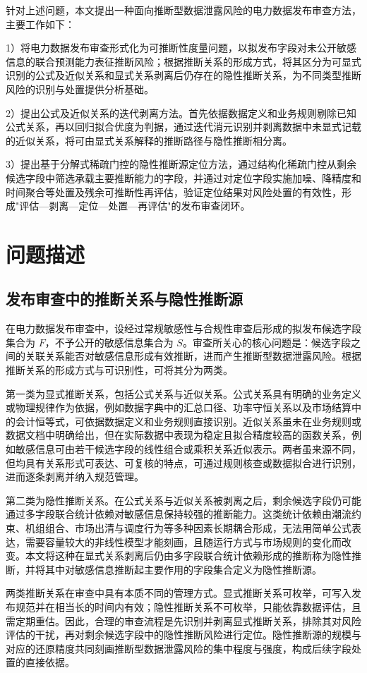 \documentclass[UTF8,zihao=5,twoside,fontset=none]{ctexart}
\begin{document}
针对上述问题，本文提出一种面向推断型数据泄露风险的电力数据发布审查方法，主要工作如下：

1）将电力数据发布审查形式化为可推断性度量问题，以拟发布字段对未公开敏感信息的联合预测能力表征推断风险；根据推断关系的形成方式，将其区分为可显式识别的公式及近似关系和显式关系剥离后仍存在的隐性推断关系，为不同类型推断风险的识别与处置提供分析基础。

2）提出公式及近似关系的迭代剥离方法。首先依据数据定义和业务规则剔除已知公式关系，再以回归拟合优度为判据，通过迭代消元识别并剥离数据中未显式记载的近似关系，将可由显式关系解释的推断路径与隐性推断相分离。

3）提出基于分解式稀疏门控的隐性推断源定位方法，通过结构化稀疏门控从剩余候选字段中筛选承载主要推断能力的字段，并通过对定位字段实施加噪、降精度和时间聚合等处置及残余可推断性再评估，验证定位结果对风险处置的有效性，形成"评估—剥离—定位—处置—再评估"的发布审查闭环。

\section{问题描述}

{\color{blue}
\subsection{发布审查中的推断关系与隐性推断源}

在电力数据发布审查中，设经过常规敏感性与合规性审查后形成的拟发布候选字段集合为 $F$，不予公开的敏感信息集合为 $S$。审查所关心的核心问题是：候选字段之间的关联关系能否对敏感信息形成有效推断，进而产生推断型数据泄露风险。根据推断关系的形成方式与可识别性，可将其分为两类。

第一类为显式推断关系，包括公式关系与近似关系。公式关系具有明确的业务定义或物理规律作为依据，例如数据字典中的汇总口径、功率守恒关系以及市场结算中的会计恒等式，可依据数据定义和业务规则直接识别。近似关系虽未在业务规则或数据文档中明确给出，但在实际数据中表现为稳定且拟合精度较高的函数关系，例如敏感信息可由若干候选字段的线性组合或乘积关系近似表示。两者虽来源不同，但均具有关系形式可表达、可复核的特点，可通过规则核查或数据拟合进行识别，进而逐条剥离并纳入规范管理。

第二类为隐性推断关系。在公式关系与近似关系被剥离之后，剩余候选字段仍可能通过多字段联合统计依赖对敏感信息保持较强的推断能力。这类统计依赖由潮流约束、机组组合、市场出清与调度行为等多种因素长期耦合形成，无法用简单公式表达，需要容量较大的非线性模型才能刻画，且随运行方式与市场规则的变化而改变。本文将这种在显式关系剥离后仍由多字段联合统计依赖形成的推断称为隐性推断，并将其中对敏感信息推断起主要作用的字段集合定义为隐性推断源。

两类推断关系在审查中具有本质不同的管理方式。显式推断关系可枚举，可写入发布规范并在相当长的时间内有效；隐性推断关系不可枚举，只能依靠数据评估，且需定期重估。因此，合理的审查流程是先识别并剥离显式推断关系，排除其对风险评估的干扰，再对剩余候选字段中的隐性推断风险进行定位。隐性推断源的规模与对应的还原精度共同刻画推断型数据泄露风险的集中程度与强度，构成后续字段处置的直接依据。
}
\end{document}
